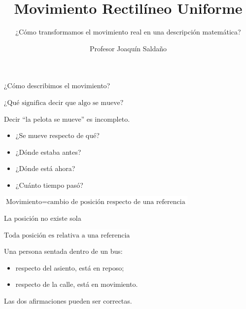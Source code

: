\documentclass[aspectratio=169,11pt]{beamer}
\title{Movimiento Rectilíneo Uniforme}
\subtitle{¿Cómo transformamos el movimiento real en una descripción matemática?}
\author{Profesor Joaquín Saldaño}
\institute{Preuniversitario Solidario PREUV}
\date{}
\newcommand{\pregunta}[1]{%
  \begin{center}
  \setlength{\fboxsep}{10pt}
  \colorbox{preuvgold!12}{\(\displaystyle #1\)}
  \end{center}
}
\newcommand{\caja}[1]{%
  \begin{center}
  \setlength{\fboxsep}{9pt}
  \colorbox{white}{\(\displaystyle \boxed{#1}\)}
  \end{center}
}
\begin{document}
\begin{frame}
  \titlepage
\end{frame}

\begin{frame}{¿Cómo describimos el movimiento?}
  \pregunta{\text{¿Qué significa decir que algo se mueve?}}
  \vspace{0.5em}
  Decir ``la pelota se mueve'' es incompleto.
  \begin{itemize}
    \item ¿Se mueve respecto de qué?
    \item ¿Dónde estaba antes?
    \item ¿Dónde está ahora?
    \item ¿Cuánto tiempo pasó?
  \end{itemize}
  \caja{\text{Movimiento}=\text{cambio de posición respecto de una referencia}}
\end{frame}

\begin{frame}{La posición no existe sola}
  \caja{\text{Toda posición es relativa a una referencia}}
  \vspace{0.6em}
  Una persona sentada dentro de un bus:
  \begin{itemize}
    \item respecto del asiento, está en reposo;
    \item respecto de la calle, está en movimiento.
  \end{itemize}
  \vspace{0.5em}
  Las dos afirmaciones pueden ser correctas.
  \begin{center}
  \end{center}
\end{frame}
\end{document}
